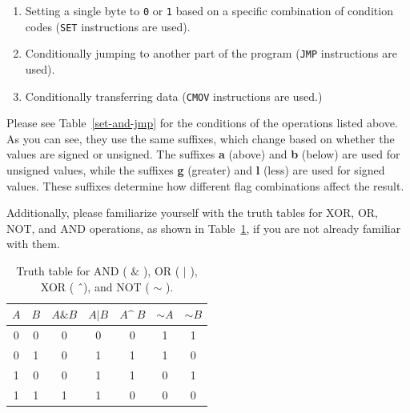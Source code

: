 \documentclass{article}
\begin{document}
\begin{enumerate}
    \item Setting a single byte to \texttt{0} or \texttt{1} based on a specific combination of condition codes (\texttt{SET} instructions are used).
    \item Conditionally jumping to another part of the program (\texttt{JMP} instructions are used).
    \item Conditionally transferring data (\texttt{CMOV} instructions are used.)
\end{enumerate}
Please see Table~\ref{set-and-jmp} for the conditions of the operations listed above. As you can see, they use the same suffixes, which change based on whether the values are signed or unsigned. The suffixes \textbf{a} (above) and \textbf{b} (below) are used for unsigned values, while the suffixes \textbf{g} (greater) and \textbf{l} (less) are used for signed values. These suffixes determine how different flag combinations affect the result. 

Additionally, please familiarize yourself with the truth tables for XOR, OR, NOT, and AND operations, as shown in Table~\ref{truth-table}, if you are not already familiar with them.

\begin{table}[h]
    \centering
    \small
    \renewcommand{\arraystretch}{1.2}
    \begin{tabular}{c c | c c c c c}
        \toprule
        $A$ & $B$ & $A \& B$ & $A | B$ & $A \^\ B$ & $\sim A$ & $\sim B$ \\
        \midrule
        0 & 0 & 0 & 0 & 0 & 1 & 1 \\
        0 & 1 & 0 & 1 & 1 & 1 & 0 \\
        1 & 0 & 0 & 1 & 1 & 0 & 1 \\
        1 & 1 & 1 & 1 & 0 & 0 & 0 \\
        \bottomrule
    \end{tabular}
    \caption{Truth table for AND ( $\&$ ), OR ( $|$ ), XOR ( \^\ ), and NOT ( $\sim$ ).}
    \label{truth-table}
\end{table}
\end{document}
